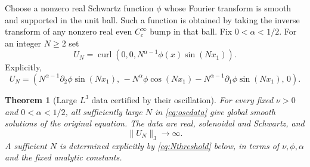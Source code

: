 \documentclass[11pt,a4paper]{article}
\newtheorem{theorem}{Theorem}[section]
\theoremstyle{definition}\newtheorem{definition}[theorem]{Definition}
\theoremstyle{remark}\newtheorem{remark}[theorem]{Remark}
\newcommand{\norm}[1]{\lVert #1\rVert}
\newcommand{\curl}{\operatorname{curl}}
\numberwithin{equation}{section}
\begin{document}
Choose a nonzero real Schwartz function $\phi$ whose Fourier transform is smooth and supported in the unit ball. Such a function is obtained by taking the inverse transform of any nonzero real even $C_c^\infty$ bump in that ball. Fix $0<\alpha<1/2$. For an integer $N\ge2$ set
\begin{equation}\label{eq:oscdata}
 U_N=\curl\left(0,0,N^{\alpha-1}\phi(x)\sin(Nx_1)\right).
\end{equation}
Explicitly,
\begin{equation}\label{eq:oscexplicit}
 U_N=\left(
 N^{\alpha-1}\partial_2\phi\sin(Nx_1),\,
 -N^\alpha\phi\cos(Nx_1)-N^{\alpha-1}\partial_1\phi\sin(Nx_1),\,0
 \right).
\end{equation}

\begin{theorem}[Large $L^3$ data certified by their oscillation]\label{thm:oscillation}
For every fixed $\nu>0$ and $0<\alpha<1/2$, all sufficiently large $N$ in \eqref{eq:oscdata} give global smooth solutions of the original equation. The data are real, solenoidal and Schwartz, and
\begin{equation}\label{eq:largeL3}
 \norm{U_N}_3\longrightarrow\infty.
\end{equation}
A sufficient $N$ is determined explicitly by \eqref{eq:Nthreshold} below, in terms of $\nu,\phi,\alpha$ and the fixed analytic constants.
\end{theorem}
\end{document}
